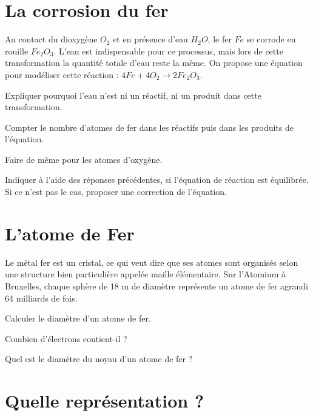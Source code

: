 \documentclass[a4paper,11pt]{exam}
\begin{document}
\newpage


\section{La corrosion du fer}

Au contact du dioxygène $O_2$ et en présence d'eau $H_2O$, le fer $Fe$ se corrode en rouille $Fe_2O_3$. L'eau est indispensable pour ce processus, mais lors de cette transformation la quantité totale d'eau reste la même. On propose une équation pour modéliser cette réaction : $4 Fe + 4 O_2 \rightarrow 2 Fe_2O_3$.


\begin{questions}
	\question Expliquer pourquoi l'eau n'est ni un réactif, ni un produit dans cette transformation.
	\fillwithdottedlines{1.5cm}
	
	\question Compter le nombre d'atomes de fer dans les réactifs puis dans les produits de l'équation.
	\fillwithdottedlines{1.5cm}
	
	\question Faire de même pour les atomes d'oxygène.
	\fillwithdottedlines{1.5cm}
	
	\question Indiquer à l'aide des réponses précédentes, si l'équation de réaction est équilibrée. Si ce n'est pas le cas, proposer une correction de l'équation.
	\fillwithdottedlines{2.5cm}
\end{questions}

\section{L'atome de Fer}

Le métal fer est un cristal, ce qui veut dire que ses atomes sont organisés selon une structure bien particulière appelée maille élémentaire. Sur l'Atomium à Bruxelles, chaque sphère de 18 m de diamètre représente un atome de fer agrandi 64 milliards de fois.

\begin{questions}
	\question Calculer le diamètre d'un atome de fer.
	\fillwithdottedlines{1.5cm}
	
	\question Combien d'électrons contient-il ?
	\fillwithdottedlines{1.5cm}
	
	\question Quel est le diamètre du noyau d'un atome de fer ?
	\fillwithdottedlines{1.5cm}
\end{questions}


\section{Quelle représentation ?}
\end{document}

